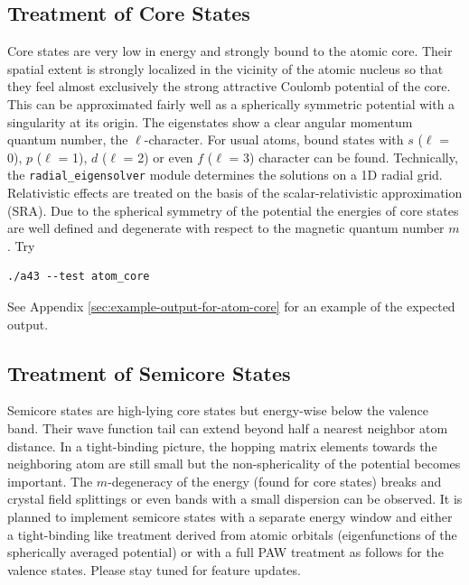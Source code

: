 \documentclass[oribibl]{llncs}
\newcommand{\ttt}[1]{\texttt{#1}}
\begin{document}
\subsection{Treatment of Core States} \label{sec:core-states}
%
Core states are very low in energy and strongly bound to the atomic core.
Their spatial extent is strongly localized in the vicinity of the atomic nucleus
so that they feel almost exclusively the strong attractive Coulomb potential of the core. 
This can be approximated fairly well as a spherically symmetric potential
with a singularity at its origin.
The eigenstates show a clear angular momentum quantum number, the $\ell$-character. 
For usual atoms, bound states with $s$ ($\ell$ = 0), $p$ ($\ell$ = 1), $d$ ($\ell$ = 2) or even $f$ ($\ell$ = 3) character can be found.
Technically, the \ttt{radial\_eigensolver} module determines the solutions on a 1D radial grid.
Relativistic effects are treated on the basis of the scalar-relativistic approximation (SRA).
Due to the spherical symmetry of the potential
the energies of core states are well defined
and degenerate with respect to the magnetic quantum number $m$.
Try
\begin{verbatim}
./a43 --test atom_core
\end{verbatim}
See Appendix \ref{sec:example-output-for-atom-core} for an example of the expected output.
%
%
\subsection{Treatment of Semicore States} \label{sec:semincore-states}
%
Semicore states are high-lying core states but energy-wise below the valence band.
Their wave function tail can extend beyond half a nearest neighbor atom distance.
In a tight-binding picture, the hopping matrix elements towards the neighboring atom are still small
but the non-sphericality of the potential becomes important.
The $m$-degeneracy of the energy (found for core states) breaks 
and crystal field splittings or even bands with a small dispersion can be observed.
\noindent
It is planned to implement semicore states with a separate energy window
and either a tight-binding like treatment derived from atomic orbitals 
(eigenfunctions of the spherically averaged potential) 
or with a full \ac{PAW} treatment as follows for the valence states.
Please stay tuned for feature updates.

%
%
\end{document}
